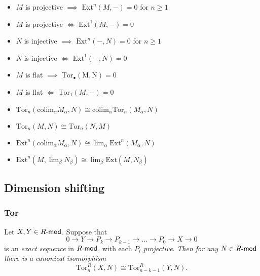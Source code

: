 \documentclass[10pt]{article}
\newcommand{\Rmod}{R\hbox{-}\mathsf{mod}}
\newcommand{\Tor}{\mathrm{Tor}}
\begin{document}
            \begin{itemize}
            \item
              $M$ is projective $\implies$ $\mathrm{Ext}^n(M,-)=0$ for
              $n\geqslant1$
            \item
              $M$ is projective $\iff$ $\mathrm{Ext}^1(M,-)=0$\bigskip
            \item
              $N$ is injective $\implies$ $\mathrm{Ext}^n(-,N)=0$ for
              $n\geqslant1$
            \item
              $N$ is injective $\iff$ $\mathrm{Ext}^1(-,N)=0$\bigskip
            \item
              $M$ is flat $\implies$ $\mathrm{Tor_\bullet(M,N)}=0$
            \item
              $M$ is flat $\iff$ $\mathrm{Tor}_1(M,-)=0$\bigskip
            \item
              $\mathrm{Tor}_n(\mathrm{colim}_\alpha M_\alpha,N)\cong\mathrm{colim}_\alpha\mathrm{Tor}_n(M_\alpha,N)$
            \item
              $\mathrm{Tor}_n(M,N)\cong\mathrm{Tor}_n(N,M)$
            \item
              $\mathrm{Ext}^n(\mathrm{colim}_\alpha M_\alpha, N)\cong\lim_\alpha\mathrm{Ext}^n(M_\alpha,N)$
            \item
              $\mathrm{Ext}^n(M,\lim_\beta N_\beta)\cong\lim_\beta\mathrm{Ext}(M,N_\beta)$
            \end{itemize}

        \subsection{Dimension shifting}

            \subsubsection{Tor}

                Let $X,Y\in\Rmod$.
                Suppose that
                \begin{equation*}
                    0\to Y\to P_k\to P_{k-1}\to\ldots\to P_0\to X\to0
                \end{equation*}
                is an \emph{exact sequence} in $\Rmod$, with each $P_i$ \emph{projective}.
                \emph{Then for any $N\in\Rmod$ there is a canonical isomorphism}
                \begin{equation*}
                    \Tor_n^R(X,N)\cong\Tor_{n-k-1}^R(Y,N).
                \end{equation*}
\end{document}

